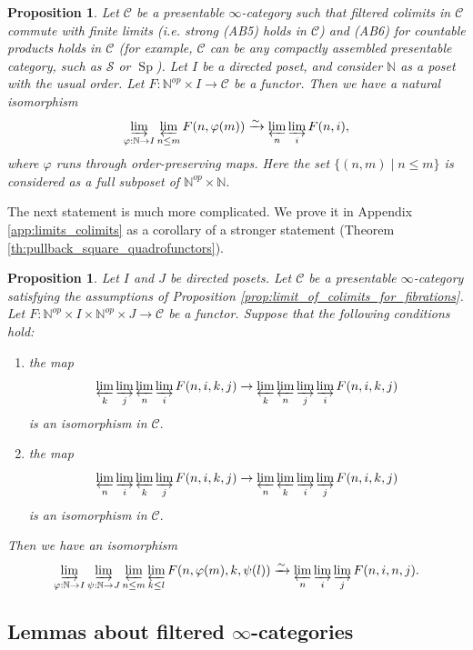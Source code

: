 \documentclass[11pt,leqno]{amsart}
\newtheorem{prop}[theo]{Proposition}
\numberwithin{equation}{section}
\def\N{\mathbb{N}}
\newcommand{\indlim}[1][]{\mathop{\varinjlim}\limits_{#1}}
\newcommand{\prolim}[1][]{\mathop{\varprojlim}\limits_{#1}}
\newcommand{\xto}{\xrightarrow}
\newcommand{\cC}{{\mathcal C}}
\newcommand{\cS}{{\mathcal S}}
\newcommand{\Sp}{\operatorname{Sp}}
\begin{document}
\begin{prop}\label{prop:seq_limits_of_filtered_colimits} \cite[Lemma D.4]{E24} Let $\cC$ be a presentable $\infty$-category such that filtered colimits in $\cC$ commute with finite limits (i.e. strong (AB5) holds in $\cC$) and (AB6) for countable products holds in $\cC$ (for example, $\cC$ can be any compactly assembled presentable category, such as $\cS$ or $\Sp$). Let $I$ be a directed poset, and consider $\N$ as a poset with the usual order. Let $F:\N^{op}\times I\to \cC$ be a functor. Then we have a natural isomorphism
$$\indlim[\varphi:\N\to I]\prolim[n\leq m]F(n,\varphi(m))\xto{\sim}\prolim[n]\indlim[i]F(n,i),$$
where $\varphi$ runs through order-preserving maps.
Here the set $\{(n,m)\mid n\leq m\}$ is considered as a full subposet of $\N^{op}\times\N.$\end{prop}

The next statement is much more complicated. We prove it in Appendix \ref{app:limits_colimits} as a corollary of a stronger statement (Theorem \ref{th:pullback_square_quadrofunctors}).

\begin{prop}\label{prop:quadrofunctors} Let $I$ and $J$ be directed posets. Let $\cC$ be a presentable $\infty$-category satisfying the assumptions of Proposition \ref{prop:limit_of_colimits_for_fibrations}. Let $F:\N^{op}\times I\times\N^{op}\times J\to\cC$ be a functor. Suppose that the following conditions hold:
	\begin{enumerate}[label=(\roman*),ref=(\roman*)]
		\item the map $$\prolim[k]\indlim[j]\prolim[n]\indlim[i]F(n,i,k,j)\to \prolim[k]\prolim[n]\indlim[j]\indlim[i]F(n,i,k,j)$$
		is an isomorphism in $\cC.$ \label{tricky_assump1}
		
		\item the map $$\prolim[n]\indlim[i]\prolim[k]\indlim[j]F(n,i,k,j)\to \prolim[n]\prolim[k]\indlim[i]\indlim[j]F(n,i,k,j)$$
		is an isomorphism in $\cC.$ \label{tricky_assump2}
	\end{enumerate}
	Then we have an isomorphism
	$$\indlim[\varphi:\N\to I]\indlim[\psi:\N\to J]\prolim[n\leq m]\prolim[k\leq l]F(n,\varphi(m),k,\psi(l))\xto{\sim}\prolim[n]\indlim[i]\indlim[j]F(n,i,n,j).$$ 
\end{prop}

\subsection{Lemmas about filtered $\infty$-categories}
\label{ssec:lemmas_about_filtered}
\end{document}
